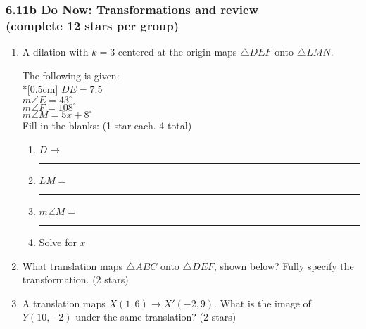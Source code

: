 \documentclass[12pt, twoside]{article}
\begin{document}
\subsubsection*{6.11b Do Now: Transformations and review\\[0.25cm]
(complete 12 stars per group)}
  \begin{enumerate}

  \item A dilation with $k=3$ centered at the origin maps $\triangle DEF$ onto $\triangle LMN$. \vspace{0.5cm}
  \begin{multicols}{2}
      The following is given:\\*[0.5cm]
      $DE=7.5$ \\
      $m\angle E = 43^\circ$ \\
      $m\angle F = 108^\circ$ \\
      $m\angle M = 5x + 8^\circ$ \\
      Fill in the blanks: \hfill (1 star each. 4 total)
      \begin{enumerate}
        \item $D \rightarrow$ \rule{2cm}{0.15mm}
        \item $LM =$ \rule{2cm}{0.15mm}
        \item $m\angle M =$ \rule{2cm}{0.15mm}
        \item Solve for $x$
      \end{enumerate}
    \end{multicols}  \vspace{3cm}

  \item What translation maps $\triangle ABC$ onto $\triangle DEF$, shown below? Fully specify the transformation.  \hfill (2 stars)\\[0.25cm]


  \item A translation maps $X(1,6) \rightarrow X'(-2,9)$. What is the image of $Y(10,-2)$ under the same translation? \hfill (2 stars)


\end{enumerate}
\end{document}

